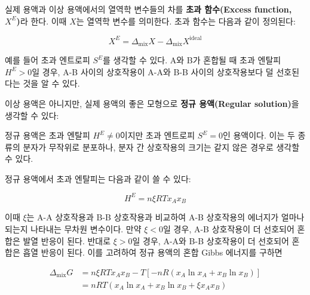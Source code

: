         \par 실제 용액과 이상 용액에서의 열역학 변수들의 차를 \textbf{초과 함수(Excess function, $X^E$)}라 한다. 이때 $X$는 열역학 변수를 의미한다. 
        초과 함수는 다음과 같이 정의된다:
        \begin{defn}[초과 함수]
        \begin{equation*}
            X^E = \Delta_\mathrm{mix}X-\Delta_\mathrm{mix}X^\mathrm{ideal}
        \end{equation*}
        \end{defn}
        예를 들어 초과 엔트로피 $S^E$를 생각할 수 있다. A와 B가 혼합될 때 초과 엔탈피 $H^E > 0$일 경우, 
        A-B 사이의 상호작용이 A-A와 B-B 사이의 상호작용보다 덜 선호된다는 것을 알 수 있다. 
        \par 이상 용액은 아니지만, 실제 용액의 좋은 모형으로 \textbf{정규 용액(Regular solution)}을 생각할 수 있다:
        \begin{defn}[정규 용액]
        정규 용액은 초과 엔탈피 $H^E \neq 0$이지만 
        초과 엔트로피 $S^E = 0$인 용액이다. 이는 두 종류의 분자가 무작위로 분포하나, 분자 간 상호작용의 크기는 같지 않은 경우로 생각할 수 있다.
        \end{defn}
        \par 정규 용액에서 초과 엔탈피는 다음과 같이 쓸 수 있다:
        \begin{obs}\label{excessenth}
        \begin{equation*}
            H^E = n \xi RT x_A x_B
        \end{equation*}
        \end{obs}
        이때 $\xi$는 A-A 상호작용과 B-B 상호작용과 비교하여 A-B 상호작용의 에너지가 얼마나 되는지 나타내는 무차원 변수이다. 
        만약 $\xi<0$일 경우, A-B 상호작용이 더 선호되어 혼합은 발열 반응이 된다. 반대로 $\xi>0$일 경우, A-A와 B-B 상호작용이 더 선호되어 
        혼합은 흡열 반응이 된다. 이를 고려하여 정규 용액의 혼합 Gibbs 에너지를 구하면
        \begin{obs}\label{excessgibbs}
        \begin{equation*}
            \begin{aligned}
                \Delta_\mathrm{mix}G &= n\xi RT x_A x_B - T\left[-nR\left(x_A \ln{x_A}+x_B \ln{x_B}\right)\right]\\
                &= nRT\left(x_A \ln{x_A}+ x_B \ln{x_B} + \xi x_A x_B\right)
            \end{aligned}
        \end{equation*}
        \end{obs}
